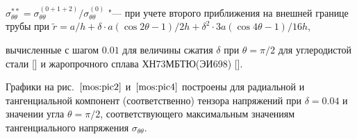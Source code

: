 $\displaystyle \sigma_{\theta\theta}^{**}={\sigma_{\theta\theta}^{(0+1+2)}}\big/{\sigma_{\theta\theta}^{(0)}}$ "--- при учете второго приближения на внешней границе трубы при $\displaystyle \widetilde{r}=a/h+\delta \cdot a(\cos 2\theta-1)/2h +{\delta}^2 \cdot 3a(\cos 4\theta-1)/16h$,

 вычисленные с шагом $ 0.01 $ для величины сжатия $\displaystyle \delta$ при $\theta=\pi/2$ для углеродистой стали [] и жаропрочного сплава ХН73МБТЮ(ЭИ698) [].














 Графики на рис.~$\ref{mos:pic2}$ и~$\ref{mos:pic4}$ построены для радиальной и тангенциальной компонент (соответственно) тензора напряжений при $\delta= 0.04$  и значении угла $\theta=\pi/2$, соответствующего максимальным значениям тангенциального напряжения $\sigma_{\theta\theta}$.





